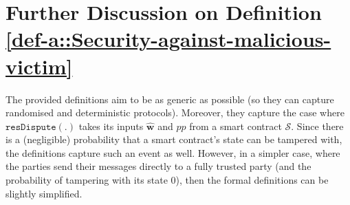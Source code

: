 \section{Further Discussion on Definition \ref{def-a::Security-against-malicious-victim}}\label{sec::Further-Discussion-on-Definition-Sec-against-victim}

The provided definitions aim to be as generic as possible (so they can capture randomised and deterministic protocols). Moreover, they capture the case where $\mathtt{resDispute}(.)$ takes its inputs $\hat{\bm w}$ and  $pp$  from a smart contract $\mathcal{S}$. Since there is a (negligible) probability that a smart contract’s state can be tampered with, the definitions capture such an event as well. However, in a simpler case, where the parties send their messages directly to a  fully trusted party (and the probability of tampering with its state $0$), then the formal definitions can be slightly simplified. 












